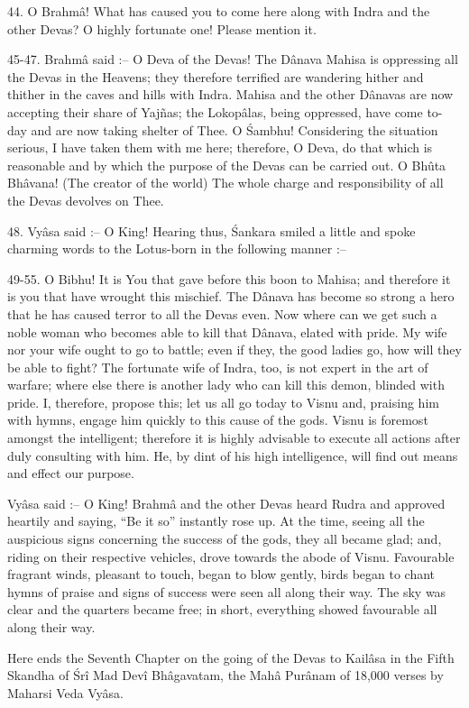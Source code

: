 44. O Brahm\^a! What has caused you to come here along with Indra and the other Devas? O highly fortunate one! Please mention it.

45-47. Brahm\^a said :-- O Deva of the Devas! The D\^anava Mahisa is oppressing all the Devas in the Heavens; they therefore terrified are wandering hither and thither in the caves and hills with Indra. Mahisa and the other D\^anavas are now accepting their share of Yajñas; the Lokop\^alas, being oppressed, have come to-day and are now taking shelter of Thee. O \'Sambhu! Considering the situation serious, I have taken them with me here; therefore, O Deva, do that which is reasonable and by which the purpose of the Devas can be carried out. O Bh\^uta Bh\^avana! (The creator of the world) The whole charge and responsibility of all the Devas devolves on Thee.

48. Vy\^asa said :-- O King! Hearing thus, \'Sankara smiled a little and spoke charming words to the Lotus-born in the following manner :--

49-55. O Bibhu! It is You that gave before this boon to Mahisa; and therefore it is you that have wrought this mischief. The D\^anava has become so strong a hero that he has caused terror to all the Devas even. Now where can we get such a noble woman who becomes able to kill that D\^anava, elated with pride. My wife nor your wife ought to go to battle; even if they, the good ladies go, how will they be able to fight? The fortunate wife of Indra, too, is not expert in the art of warfare; where else there is another lady who can kill this demon, blinded with pride. I, therefore, propose this; let us all go today to Visnu and, praising him with hymns, engage him quickly to this cause of the gods. Visnu is foremost amongst the intelligent; therefore it is highly advisable to execute all actions after duly consulting with him. He, by dint of his high intelligence, will find out means and effect our purpose.

Vy\^asa said :-- O King! Brahm\^a and the other Devas heard Rudra and approved heartily and saying, ``Be it so'' instantly rose up. At the time, seeing all the auspicious signs concerning the success of the gods, they all became glad; and, riding on their respective vehicles, drove towards the abode of Visnu. Favourable fragrant winds, pleasant to touch, began to blow gently, birds began to chant hymns of praise and signs of success were seen all along their way. The sky was clear and the quarters became free; in short, everything showed favourable all along their way.

Here ends the Seventh Chapter on the going of the Devas to Kail\^asa in the Fifth Skandha of \'Sr\^i Mad Dev\^i Bh\^agavatam, the Mah\^a Pur\^anam of 18,000 verses by Maharsi Veda Vy\^asa.

